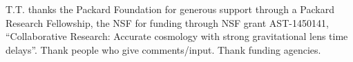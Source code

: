 %
%


\begin{acknowledgements}
T.T. thanks the Packard Foundation for generous support through a Packard Research Fellowship, the NSF for funding through NSF grant AST-1450141, ``Collaborative Research: Accurate cosmology with strong gravitational lens time delays''.
Thank people who give comments/input. Thank funding agencies.
\end{acknowledgements}



%
%




